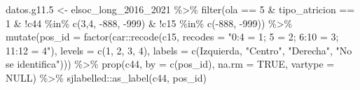 \documentclass[
  12pt,
]{book}
\newenvironment{Shaded}{\begin{snugshade}}{\end{snugshade}}
\newcommand{\AttributeTok}[1]{\textcolor[rgb]{0.77,0.63,0.00}{#1}}
\newcommand{\ConstantTok}[1]{\textcolor[rgb]{0.00,0.00,0.00}{#1}}
\newcommand{\DecValTok}[1]{\textcolor[rgb]{0.00,0.00,0.81}{#1}}
\newcommand{\FloatTok}[1]{\textcolor[rgb]{0.00,0.00,0.81}{#1}}
\newcommand{\FunctionTok}[1]{\textcolor[rgb]{0.00,0.00,0.00}{#1}}
\newcommand{\NormalTok}[1]{#1}
\newcommand{\OtherTok}[1]{\textcolor[rgb]{0.56,0.35,0.01}{#1}}
\newcommand{\SpecialCharTok}[1]{\textcolor[rgb]{0.00,0.00,0.00}{#1}}
\newcommand{\StringTok}[1]{\textcolor[rgb]{0.31,0.60,0.02}{#1}}
\begin{document}
\begin{Shaded}
\begin{Highlighting}[]
\NormalTok{datos.g11}\FloatTok{.5} \OtherTok{\textless{}{-}}\NormalTok{ elsoc\_long\_2016\_2021 }\SpecialCharTok{\%\textgreater{}\%} 
  \FunctionTok{filter}\NormalTok{(ola }\SpecialCharTok{==} \DecValTok{5} \SpecialCharTok{\&}\NormalTok{ tipo\_atricion }\SpecialCharTok{==} \DecValTok{1} \SpecialCharTok{\&} \SpecialCharTok{!}\NormalTok{c44 }\SpecialCharTok{\%in\%} \FunctionTok{c}\NormalTok{(}\DecValTok{3}\NormalTok{,}\DecValTok{4}\NormalTok{, }\SpecialCharTok{{-}}\DecValTok{888}\NormalTok{, }\SpecialCharTok{{-}}\DecValTok{999}\NormalTok{) }\SpecialCharTok{\&} \SpecialCharTok{!}\NormalTok{c15 }\SpecialCharTok{\%in\%} \FunctionTok{c}\NormalTok{(}\SpecialCharTok{{-}}\DecValTok{888}\NormalTok{, }\SpecialCharTok{{-}}\DecValTok{999}\NormalTok{)) }\SpecialCharTok{\%\textgreater{}\%} 
  \FunctionTok{mutate}\NormalTok{(}\AttributeTok{pos\_id =} \FunctionTok{factor}\NormalTok{(car}\SpecialCharTok{::}\FunctionTok{recode}\NormalTok{(c15, }\AttributeTok{recodes =} \StringTok{"0:4 = 1; 5 = 2; 6:10 = 3; 11:12 = 4"}\NormalTok{),}
                         \AttributeTok{levels =} \FunctionTok{c}\NormalTok{(}\DecValTok{1}\NormalTok{, }\DecValTok{2}\NormalTok{, }\DecValTok{3}\NormalTok{, }\DecValTok{4}\NormalTok{),}
                         \AttributeTok{labels =} \FunctionTok{c}\NormalTok{(}\StringTok{\textquotesingle{}Izquierda\textquotesingle{}}\NormalTok{, }\StringTok{"Centro"}\NormalTok{, }\StringTok{"Derecha"}\NormalTok{, }\StringTok{"No se identifica"}\NormalTok{))) }\SpecialCharTok{\%\textgreater{}\%}
  \FunctionTok{prop}\NormalTok{(c44, }\AttributeTok{by =} \FunctionTok{c}\NormalTok{(pos\_id), }\AttributeTok{na.rm =} \ConstantTok{TRUE}\NormalTok{, }\AttributeTok{vartype =} \ConstantTok{NULL}\NormalTok{) }\SpecialCharTok{\%\textgreater{}\%} 
\NormalTok{  sjlabelled}\SpecialCharTok{::}\FunctionTok{as\_label}\NormalTok{(c44, pos\_id) }


\end{Highlighting}
\end{Shaded}
\end{document}
